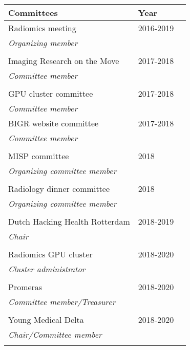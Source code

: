 \vspace*{2cm}
\begin{tabular}{L{8cm}lr}
    \textbf{Committees}&\textbf{Year}\\
    \toprule
    Radiomics meeting& 2016-2019\\
    \textit{Organizing member}\\
    \\
    Imaging Research on the Move& 2017-2018\\
    \textit{Committee member}\\
    \\
    GPU cluster committee & 2017-2018\\
    \textit{Committee member}
    \\
    BIGR website committee & 2017-2018\\
    \textit{Committee member}\\
    \\
    MISP committee & 2018\\
    \textit{Organizing committee member}\\
    \\
    Radiology dinner committee & 2018\\
    \textit{Organizing committee member}\\
    \\
    Dutch Hacking Health Rotterdam & 2018-2019\\
    \textit{Chair}\\
    \\
    Radiomics GPU cluster & 2018-2020\\
    \textit{Cluster administrator}\\
    \\
    Promeras & 2018-2020\\
    \textit{Committee member/Treasurer}\\
    \\
    Young Medical Delta & 2018-2020\\
    \textit{Chair/Committee member}\\
    \\
\end{tabular}
